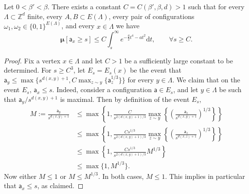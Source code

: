 \documentclass[10pt,a4paper]{amsart}
\begin{document}
\begin{lemma}\label{lem: cond regularity}
Let $0<\beta'<\beta$. There exists a constant $C=C(\beta',\beta,d)>1$ such that for every $\Lambda\subset \mathbb{Z}^d$ finite, every $A,B\subset E(\Lambda)$, every pair of configurations $\omega_1, \omega_2 \in \{0,1\}^{E(\Lambda)}$, and every $x\in \Lambda$ we have
\begin{equation}
\boldsymbol \mu [ \mathsf a_x \geq s] \leq C \int_s^\infty e^{-\frac g2 t^4 - at^2} \mathrm{d}t, \qquad \forall s \geq C. 
\end{equation}
\end{lemma}

\begin{proof}
Fix a vertex $x\in \Lambda$ and let $C>1$ be a sufficiently large constant to be determined. For $s\geq C^3$, let $E_s=E_s(x)$ be the event that $\mathsf{a}_y\leq \max\{s^{d(x,y)+1}, C\max_{z\sim y}\{\mathsf{a}_z^{1/3}\}\}$ for every $y \in \Lambda$.
We claim that on the event $E_s$, $\mathsf{a}_x\leq s$. Indeed, consider a configuration $\mathsf a\in E_s$, and let $y\in \Lambda$ be such that $\mathsf a_y/s^{d(x,y)+1}$ is maximal. Then by definition of the event $E_s$, 
\begin{equation}
\begin{aligned}
M:=\frac{\mathsf{a}_y}{s^{d(x,y)+1}}&\leq \max\left\{1, \frac{C}{s^{2(d(x,y)+1)/3}}\max_{z\sim y}\left\{\left(\frac{\mathsf{a}_z}{s^{d(x,y)+1}}\right)^{1/3}\right\}\right\}\\ 
&\leq \max\left\{1, \frac{Cs^{1/3}}{s^{2(d(x,y)+1)/3}} \max_{z\sim y}\left\{\left(\frac{\mathsf{a}_z}{s^{d(x,z)+1}}\right)^{1/3}\right\}\right\}\\
&\leq \max\left\{1, \frac{Cs^{1/3}}{s^{2(d(x,y)+1)/3}} M^{1/3}\right\}\\
&\leq \max\{1, M^{1/3}\}.
\end{aligned}
\end{equation}
Now either $M\leq 1$ or $M\leq M^{1/3}$. In both cases, $M\leq 1$. This implies in particular that $\mathsf{a}_x\leq s$, as claimed.


\end{proof}
\end{document}
